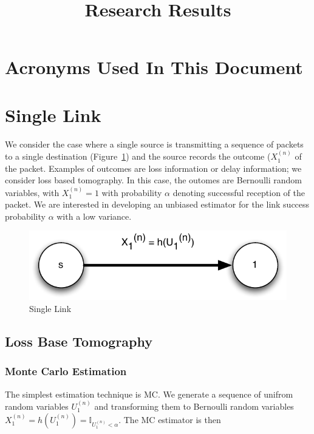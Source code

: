 \documentclass[10pt]{article}
\title{Research Results}
\begin{document}
\maketitle
\tableofcontents
\listoffigures
\section*{Acronyms Used In This Document}
\begin{acronym}
\end{acronym}

\section{Single Link}

We consider the case where a single source is transmitting a sequence of packets to a single destination (Figure~\ref{fig:single_link}) and the source records the outcome ($X_{1}^{(n)}$ of the packet. Examples of outcomes are loss information or delay information; we consider loss based tomography. In this case, the outomes are Bernoulli random variables, with $X_{1}^{(n)}=1$ with probability $\alpha$ denoting successful reception of the packet. We are interested in developing an unbiased estimator for the link success probability $\alpha$ with a low variance.

\begin{figure}[ht!]
\centering
\includegraphics[width=0.4\columnwidth]{img/single_link}
\caption{Single Link}\label{fig:single_link}
\end{figure}
\subsection{Loss Base Tomography}
\subsubsection{Monte Carlo Estimation}
The simplest estimation technique is \ac{MC}. We generate a sequence of unifrom random variables $U_{1}^{(n)}$ and transforming them to Bernoulli random variables $X_{1}^{(n)} = h(U_{1}^{(n)}) = \mathbb{I}_{U_{1}^{(n)} < \alpha}$. The \ac{MC} estimator is then
\end{document}
